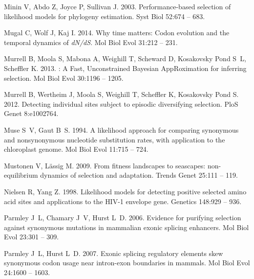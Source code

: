 \documentclass[11pt]{article}
\begin{document}
\begin{thebibliography}{79}
Minin V, Abdo Z, Joyce P, Sullivan J. 2003.
\newblock Performance-based selection of likelihood models for phylogeny
  estimation.
\newblock Syst Biol 52:674 -- 683.

Mugal C, Wolf J, Kaj I. 2014.
\newblock Why time matters: Codon evolution and the temporal dynamics of
  \emph{dN/dS}.
\newblock Mol Biol Evol 31:212 -- 231.

Murrell B, Moola S, Mabona A, Weighill T, Scheward D, {Kosakovsky Pond} S~L,
  Scheffler K. 2013.
: A {F}ast, {U}nconstrained {B}ayesian {A}pp{R}oximation for
  inferring selection.
\newblock Mol Biol Evol 30:1196 -- 1205.

Murrell B, Wertheim J, Moola S, Weighill T, Scheffler K, {Kosakovsky Pond} S.
  2012.
\newblock Detecting individual sites subject to episodic diversifying
  selection.
\newblock PloS Genet 8:e1002764.

Muse S~V, Gaut B~S. 1994.
\newblock A likelihood approach for comparing synonymous and nonsynonymous
  nucleotide substitution rates, with application to the chloroplast genome.
\newblock Mol Biol Evol 11:715 -- 724.

Mustonen V, L\"{a}ssig M. 2009.
\newblock From fitness landscapes to seascapes: non-equilibrium dynamics of
  selection and adaptation.
\newblock Trends Genet 25:111 -- 119.

Nielsen R, Yang Z. 1998.
\newblock Likelihood models for detecting positive selected amino acid sites
  and applications to the {HIV-1} envelope gene.
\newblock Genetics 148:929 -- 936.

Parmley J~L, Chamary J~V, Hurst L~D. 2006.
\newblock Evidence for purifying selection against synonymous mutations in
  mammalian exonic splicing enhancers.
\newblock Mol Biol Evol 23:301 -- 309.

Parmley J~L, Hurst L~D. 2007.
\newblock Exonic splicing regulatory elements skew synonymous codon usage near
  intron-exon boundaries in mammals.
\newblock Mol Biol Evol 24:1600 -- 1603.


\end{thebibliography}
\end{document}
